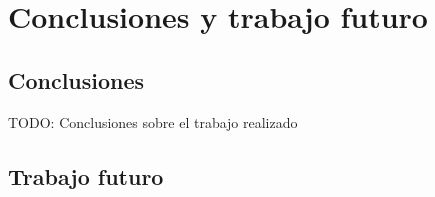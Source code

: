 \chapter{Conclusiones y trabajo futuro\label{sec:conclusiones}}

\section{Conclusiones}
TODO: Conclusiones sobre el trabajo realizado

\section{Trabajo futuro}